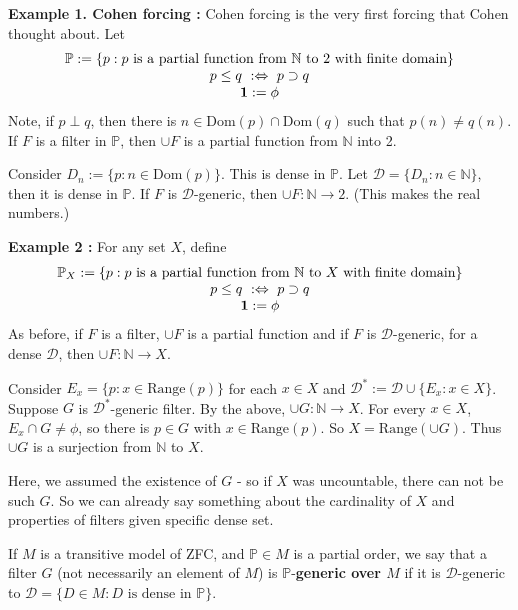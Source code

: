 \documentclass[12pt,a4paper]{article}
\begin{document}
\textbf{Example 1. Cohen forcing :} Cohen forcing is the very first forcing that Cohen thought about. Let
\begin{align*}
\begin{array}{c}
\mathbb{P} := \{p : p \text{ is a partial function from } \mathbb{N} \text{ to } 2 \text{ with finite domain} \} \\
p\leq q \,\, :\Leftrightarrow \,\, p \supset q \\
\bm{1} := \phi
\end{array}
\end{align*}
Note, if $p\perp q$, then there is $n\in \text{Dom}(p) \cap \text{Dom}(q)$ such that $p(n) \neq q(n)$. If $F$ is a filter in $\mathbb{P}$, then $\cup F$ is a partial function from $\mathbb{N}$ into 2. 

\quad Consider $D_n := \{p : n\in \text{Dom}(p)\}$. This is dense in $\mathbb{P}$. Let $\mathscr{D} = \{D_n : n\in \mathbb{N}\}$, then it is dense in $\mathbb{P}$. If $F$ is $\mathscr{D}$-generic, then $\cup F : \mathbb{N} \rightarrow 2$. (This makes the real numbers.)
\s

\textbf{Example 2 :} For any set $X$, define
\begin{align*}
\begin{array}{c}
\mathbb{P}_X := \{p : p \text{ is a partial function from } \mathbb{N} \text{ to } X \text{ with finite domain} \} \\
p\leq q \,\, :\Leftrightarrow \,\,  p \supset q \\
\bm{1} := \phi
\end{array}
\end{align*}
As before, if $F$ is a filter, $\cup F$ is a partial function and if $F$ is $\mathscr{D}$-generic, for a dense $\mathscr{D}$, then $\cup F: \mathbb{N} \rightarrow X$.

\quad Consider $E_x = \{p : x\in \text{Range}(p) \}$ for each $x\in X$ and $\mathscr{D}^* := \mathscr{D} \cup \{E_x : x\in X \}$. Suppose $G$ is $\mathscr{D}^*$-generic filter. By the above, $\cup G : \mathbb{N} \rightarrow X$. For every $x\in X$, $E_x \cap G \neq \phi$, so there is $p\in G$ with $x\in \text{Range}(p)$. So $X = \text{Range}(\cup G)$. Thus $\cup G$ is a surjection from $\mathbb{N}$ to $X$.

\quad Here, we assumed the existence of $G$ - so if $X$ was uncountable, there can not be such $G$. So we can already say something about the cardinality of $X$ and properties of filters given specific dense set. 
\s

 If $M$ is a transitive model of ZFC, and $\mathbb{P}\in M$ is a partial order, we say that a filter $G$ (not necessarily an element of $M$) is $\mathbb{P}$-\textbf{generic over $M$} if it is $\mathscr{D}$-generic to $\mathscr{D} = \{D\in M : D \text{ is dense in } \mathbb{P} \}$.
\s
\end{document}
